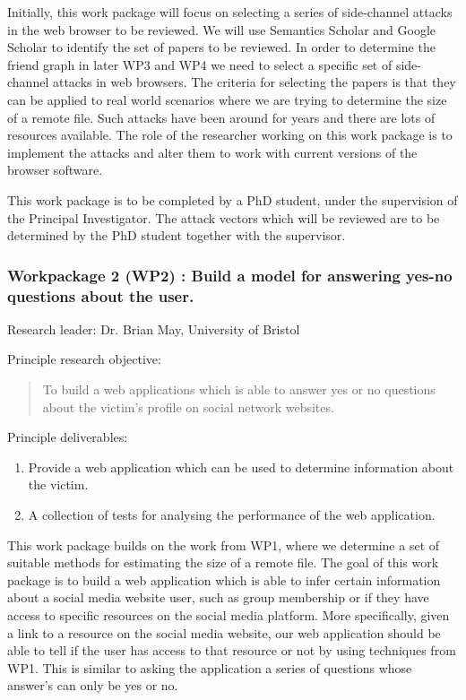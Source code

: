 \documentclass[a4paper,11pt]{article}
\begin{document}
Initially, this work package will focus on selecting a series of side-channel attacks in the web browser to be reviewed. We will use Semantics Scholar \cite{semanticsearch} and Google Scholar\cite{googlescholar} to identify the set of papers to be reviewed. In order to determine the friend graph in later WP3 and WP4 we need to select a specific set of side-channel attacks in web browsers. The criteria for selecting the papers is that they can be applied to real world scenarios where we are trying to determine the size of a remote file. Such attacks have been around for years and there are lots of resources available. The role of the researcher working on this work package is to implement the attacks and alter them to work with current versions of the browser software. 

This work package is to be completed by a PhD student, under the supervision of the Principal Investigator. The attack vectors which will be reviewed are to be determined by the PhD student together with the supervisor.


\subsubsection*{Workpackage 2 (WP2) : Build a model for answering yes-no questions about the user.}
Research leader: Dr. Brian May, University of Bristol

Principle research objective:
\begin{quote}
	To build a web applications which is able to answer yes or no questions about the victim's profile on social network websites.
\end{quote}

Principle deliverables:
\begin{enumerate}
\item Provide a web application which can be used to determine information about the victim.
\item A collection of tests for analysing the performance of the web application.
\end{enumerate}

This work package builds on the work from WP1, where we determine a set of suitable methods for estimating the size of a remote file. The goal of this work package is to build a web application which is able to infer certain information about a social media website user, such as group membership or if they have access to specific resources on the social media platform. More specifically, given a link to a resource on the social media website, our web application should be able to tell if the user has access to that resource or not by using techniques from WP1. This is similar to asking the application a series of questions whose answer's can only be yes or no.
\end{document}
